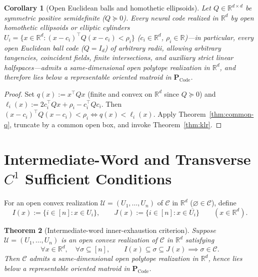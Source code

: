 \documentclass[11pt]{article}
\theoremstyle{plain}
\newtheorem{theorem}{Theorem}
\newtheorem{corollary}[theorem]{Corollary}
\theoremstyle{definition}
\theoremstyle{remark}
\newcommand{\PCode}{\mathbf{P}_{\mathrm{Code}}}
\begin{document}
\begin{corollary}[Open Euclidean balls and homothetic ellipsoids]\label{cor:balls}
Let $Q \in \mathbb{R}^{d \times d}$ be symmetric positive semidefinite ($Q \succeq 0$). Every neural code realized in $\mathbb{R}^d$ by open homothetic ellipsoids or elliptic cylinders $U_i = \{x \in \mathbb{R}^d : (x - c_i)^\top Q (x - c_i) < \rho_i\}$ ($c_i \in \mathbb{R}^d$, $\rho_i \in \mathbb{R}$)—in particular, every open Euclidean ball code ($Q = I_d$) of arbitrary radii, allowing arbitrary tangencies, coincident fields, finite intersections, and auxiliary strict linear halfspaces—admits a same-dimensional open polytope realization in $\mathbb{R}^d$, and therefore lies below a representable oriented matroid in $\PCode$.
\end{corollary}

\begin{proof}
Set $q(x) := x^\top Q x$ (finite and convex on $\mathbb{R}^d$ since $Q \succeq 0$) and $\ell_i(x) := 2 c_i^\top Q x + \rho_i - c_i^\top Q c_i$. Then $(x - c_i)^\top Q (x - c_i) < \rho_i \iff q(x) < \ell_i(x)$. Apply Theorem~\ref{thm:common-q}, truncate by a common open box, and invoke Theorem~\ref{thm:klr}.
\end{proof}

\section{Intermediate-Word and Transverse \texorpdfstring{$C^1$}{C1} Sufficient Conditions}

For an open convex realization $\mathcal{U} = (U_1, \dots, U_n)$ of $\mathcal{C}$ in $\mathbb{R}^d$ ($\varnothing \in \mathcal{C}$), define
\[
I(x) := \{i \in [n] : x \in U_i\}, \qquad J(x) := \{i \in [n] : x \in \overline{U_i}\} \qquad (x \in \mathbb{R}^d).
\]

\begin{theorem}[Intermediate-word inner-exhaustion criterion]\label{thm:iwc}
Suppose $\mathcal{U} = (U_1, \dots, U_n)$ is an open convex realization of $\mathcal{C}$ in $\mathbb{R}^d$ satisfying
\begin{equation}\label{eq:iwc}
\forall x \in \mathbb{R}^d,\quad \forall \sigma \subseteq [n],\qquad I(x) \subseteq \sigma \subseteq J(x) \implies \sigma \in \mathcal{C}.
\end{equation}
Then $\mathcal{C}$ admits a same-dimensional open polytope realization in $\mathbb{R}^d$, hence lies below a representable oriented matroid in $\PCode$.
\end{theorem}
\end{document}
